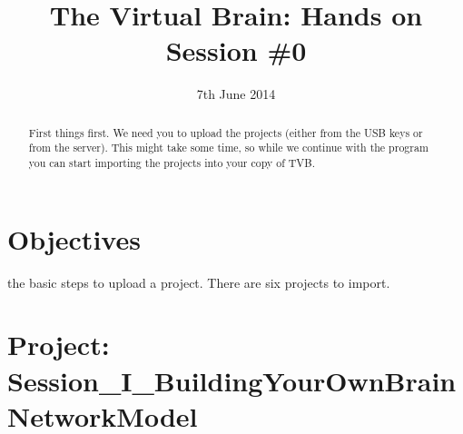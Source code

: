 \documentclass{tufte-handout}
\title{The Virtual Brain: Hands on Session \#0}
\date{7th June 2014}
\begin{document}

\newpage
\ClearWallPaper
\begin{abstract}

First things first. We need you to upload the projects (either from the USB
keys or from the server). This might take some time, so while we continue with
the program you can start importing the projects into your copy of TVB.

\end{abstract}



\section{Objectives}\label{sec:objectives}

 the basic steps to upload a project. There are six projects to import.

\section{Project:  Session\_I\_BuildingYourOwnBrainNetworkModel}\label{sec:project_data}
\end{document}
